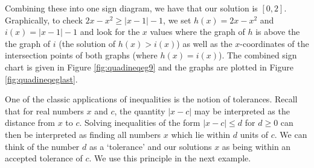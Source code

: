 {\begin{enumerate}
Combining these into one sign diagram, we have that our solution is $[0,2]$.  Graphically, to check $2x-x^2 \geq |x-1|-1$, we set $h(x) = 2x-x^2$ and $i(x) = |x-1|-1$ and look for the $x$ values where the graph of $h$ is above the the graph of $i$ (the solution of $h(x) > i(x)$) as well as the $x$-coordinates of the intersection points of both graphs (where $h(x)=i(x)$).  The combined sign chart is given in Figure \ref{fig:quadineqeg9} and the graphs are plotted in Figure \ref{fig:quadineqeglast}.

\end{enumerate}
}

\medskip


One of the classic applications of inequalities is the notion of tolerances.  Recall that for real numbers $x$ and $c$, the quantity $|x-c|$ may be interpreted as the distance from $x$ to $c$.  Solving inequalities of the form $|x-c| \leq d$ for $d \geq 0$ can then be interpreted as finding all numbers $x$ which lie within $d$ units of $c$.  We can think of the number $d$ as a `tolerance' and our solutions $x$ as being within an accepted tolerance of $c$.  We use this principle in the next example.



\medskip

